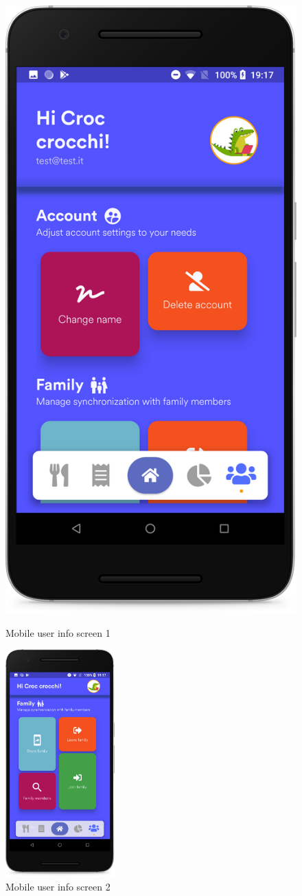 \vspace*{-0.3cm}
\begin{figure}[H]
  \begin{minipage}{0.5\textwidth}
  \centering
    \includegraphics[width=42.mm,scale=0.9]{./Images//Mobile_mocks/user1.png}
    \vspace*{-0.3cm}
    \caption{Mobile user info screen 1}
    \end{minipage}
\hfill
   \begin{minipage}{0.5\textwidth}
     \centering
     \includegraphics[width=42mm,scale=0.9]{./Images//Mobile_mocks/user2.png}
     \vspace*{-0.3cm}
     \caption{Mobile user info screen 2}
   \end{minipage}
\end{figure}

